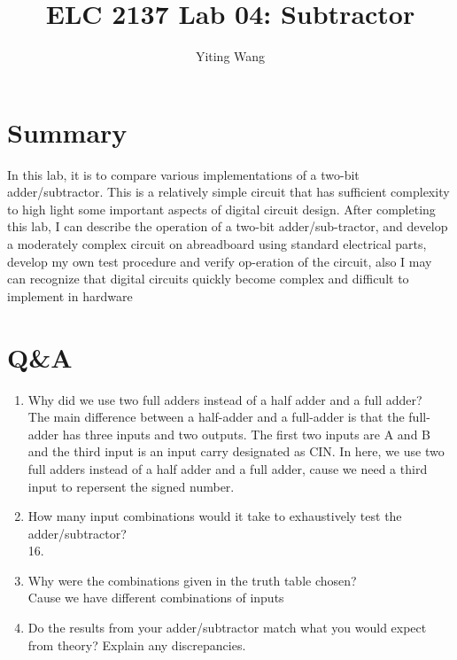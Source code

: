 \documentclass[11pt]{article}
\begin{document}
\title{ELC 2137 Lab 04: Subtractor}
\author{Yiting Wang}

\maketitle


\section*{Summary}

	In this lab, it is to compare various implementations of a two-bit adder/subtractor. This is a relatively simple circuit that has sufficient complexity to high light some important aspects of digital circuit design. After completing this lab, I can describe the operation of a two-bit adder/sub-tractor, and develop a moderately complex circuit on abreadboard using standard electrical parts, develop my own test procedure and verify op-eration of the circuit, also I may can recognize that digital circuits quickly become complex and difficult to implement in hardware



\section*{Q\&A}

	\begin{enumerate}
		\item Why did we use two full adders instead of a half adder and a full adder?\\
			The main difference between a half-adder and a full-adder is that the full-adder has three inputs and two outputs. The first two inputs are A and B and the third input is an input carry designated as CIN. In here, we use two full adders instead of a half adder and a full adder, cause we need a third input to repersent the signed number.\\
			
		\item How many input combinations would it take to exhaustively test the adder/subtractor?\\
			16.\\
		\item Why were the combinations given in the truth table chosen?\\
			Cause we have different combinations of inputs
		\item Do the results from your adder/subtractor match what you would expect from theory? Explain any discrepancies.\\
		
	\end{enumerate}
\end{document}
